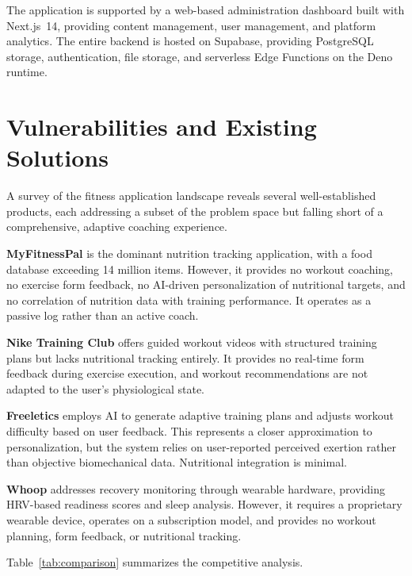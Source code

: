 The application is supported by a web-based administration dashboard
built with Next.js~14, providing content management, user management, and
platform analytics. The entire backend is hosted on Supabase, providing
PostgreSQL storage, authentication, file storage, and serverless Edge
Functions on the Deno runtime.


\section{Vulnerabilities and Existing Solutions}
A survey of the fitness application landscape reveals several
well-established products, each addressing a subset of the problem space
but falling short of a comprehensive, adaptive coaching experience.

\textbf{MyFitnessPal} is the dominant nutrition tracking application,
with a food database exceeding 14 million items. However, it provides no
workout coaching, no exercise form feedback, no AI-driven personalization
of nutritional targets, and no correlation of nutrition data with
training performance. It operates as a passive log rather than an active
coach.

\textbf{Nike Training Club} offers guided workout videos with structured
training plans but lacks nutritional tracking entirely. It provides no
real-time form feedback during exercise execution, and workout
recommendations are not adapted to the user's physiological state.

\textbf{Freeletics} employs AI to generate adaptive training plans and
adjusts workout difficulty based on user feedback. This represents a
closer approximation to personalization, but the system relies on
user-reported perceived exertion rather than objective biomechanical
data. Nutritional integration is minimal.

\textbf{Whoop} addresses recovery monitoring through wearable hardware,
providing HRV-based readiness scores and sleep analysis. However, it
requires a proprietary wearable device, operates on a subscription model,
and provides no workout planning, form feedback, or nutritional tracking.

Table~\ref{tab:comparison} summarizes the competitive analysis.

